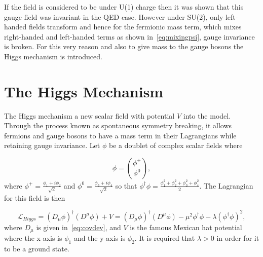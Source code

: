 If the field is considered to be under U(1) charge then it was shown that this gauge field was invariant in the QED case. However under SU(2), only left-handed fields transform and hence for the fermionic mass term, which mixes right-handed and left-handed terms as shown in~\autoref{eq:mixingpsi}, gauge invariance is broken.
For this very reason and also to give mass to the gauge bosons the Higgs mechanism is introduced.

\section{The Higgs Mechanism}
\label{higgs}
The Higgs mechanism \DIFdelbegin {}\DIFdelend \DIFaddbegin {}\DIFaddend a new scalar field with potential $V$ into the model. Through the process known as spontaneous symmetry breaking, it allows fermions and gauge bosons to have a mass term in their Lagrangians while retaining gauge invariance. Let $\phi$ be a doublet of complex scalar fields where

\begin{equation}
\phi = \binom{\phi^{+}}{\phi^{0}},
\end{equation}
where $\phi^{+} = \frac{\phi_{1} + i{\phi_{2}}}{\sqrt{2}}$ and $\phi^{0} = \frac{\phi_{3} + i{\phi_{4}}}{\sqrt{2}}$ so that $\phi^{\dagger}\phi = \frac{\phi_{1}^{2} + \phi_{2}^{2} + \phi_{3}^{2} + \phi_{4}^{2}}{2}$.  The Lagrangian for this field is then

\begin{equation}
	\mathcal{L}_{Higgs} = (D_{\mu}\phi)^{\dagger}(D^{\mu}\phi) + V = (D_{\mu}\phi)^{\dagger}(D^{\mu}\phi) - \mu^{2}\phi^{\dagger}\phi - \lambda (\phi^{\dagger}\phi)^{2},
\end{equation}
where $D_{\mu}$ is given in~\autoref{eq:covdev}, and $V$ is the famous Mexican hat potential where the x-axis is $\phi_{1}$ and the y-axis is $\phi_{2}$. It is required that $\lambda>0$ in order for it to be a ground state.

